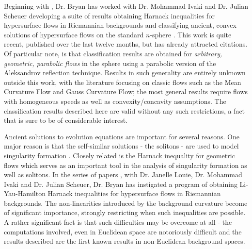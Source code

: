 \documentclass[12pt]{amsart}
\begin{document}
Beginning with \cite{bryanlouie}, Dr. Bryan has worked with Dr. Mohammad Ivaki and Dr. Julian Scheuer developing a suite of results obtaining Harnack inequalities for hypersurface flows in Riemannian backgrounds and classifying ancient, convex solutions of hypersurface flows on the standard $n$-sphere \cite{BIS4,2016arXiv160401694B,2016arXiv160401694B,2015arXiv150802821B}. This work is quite recent, published over the last twelve months, but has already attracted citations. Of particular note, is that classification results are obtained for \emph{arbitrary, geometric, parabolic flows} in the sphere using a parabolic version of the Aleksandrov reflection technique. Results in such generality are entirely unknown outside this work, with the literature focusing on classic flows such as the Mean Curvature Flow and Gauss Curvature Flow; the most general results require flows with homogeneous speeds as well as convexity/concavity assumptions. The classification results described here are valid without any such restrictions, a fact that is sure to be of considerable interest.

Ancient solutions to evolution equations are important for several reasons. One major reason is that the self-similar solutions - the solitons - are used to model singularity formation \cite{MR1375255,MR1666878}. Closely related is the Harnack inequality for geometric flows \cite{MR1296393,MR1316556,MR1100812,MR1198607} which serves as an important tool in the analysis of singularity formation as well as solitons. In the series of papers \cite{bryanlouie,2016arXiv160401694B,2015arXiv150802821B,2015arXiv151203374B}, with Dr. Janelle Louie, Dr. Mohammad Ivaki and Dr. Julian Scheuer, Dr. Bryan has instigated a program of obtaining Li-Yau-Hamilton Harnack inequalities for hypersurface flows in Riemannian backgrounds. The non-linearities introduced by the background curvature become of significant importance, strongly restricting when such inequalities are possible. A rather significant fact is that such difficulties may be overcome at all - the computations involved, even in Euclidean space are notoriously difficult and the results described are the first known results in non-Euclidean background spaces.
\end{document}
